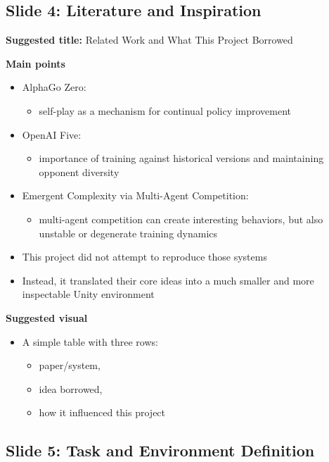 \documentclass[11pt]{article}
\begin{document}
\subsection*{Slide 4: Literature and Inspiration}

\textbf{Suggested title:} Related Work and What This Project Borrowed

\textbf{Main points}
\begin{itemize}
    \item AlphaGo Zero:
    \begin{itemize}
        \item self-play as a mechanism for continual policy improvement
    \end{itemize}
    \item OpenAI Five:
    \begin{itemize}
        \item importance of training against historical versions and maintaining opponent diversity
    \end{itemize}
    \item Emergent Complexity via Multi-Agent Competition:
    \begin{itemize}
        \item multi-agent competition can create interesting behaviors, but also unstable or degenerate training dynamics
    \end{itemize}
    \item This project did not attempt to reproduce those systems
    \item Instead, it translated their core ideas into a much smaller and more inspectable Unity environment
\end{itemize}

\textbf{Suggested visual}
\begin{itemize}
    \item A simple table with three rows:
    \begin{itemize}
        \item paper/system,
        \item idea borrowed,
        \item how it influenced this project
    \end{itemize}
\end{itemize}

\subsection*{Slide 5: Task and Environment Definition}
\end{document}
